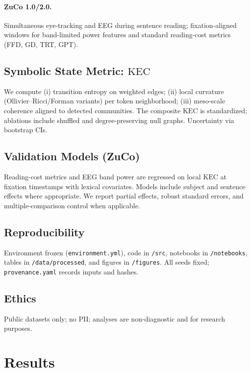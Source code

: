 \documentclass[11pt]{article}
\newcommand{\code}[1]{\texttt{#1}}
\newcommand{\kec}{\ensuremath{\mathrm{KEC}}}
\begin{document}
\paragraph{ZuCo 1.0/2.0.} Simultaneous eye-tracking and EEG during sentence reading; fixation-aligned windows for band-limited power features and standard reading-cost metrics (FFD, GD, TRT, GPT).

\subsection{Symbolic State Metric: \kec{}}
We compute (i) transition entropy on weighted edges; (ii) local curvature (Ollivier--Ricci/Forman variants) per token neighborhood; (iii) meso-scale coherence aligned to detected communities. The composite \kec{} is standardized; ablations include shuffled and degree-preserving null graphs. Uncertainty via bootstrap CIs.

\subsection{Validation Models (ZuCo)}
Reading-cost metrics and EEG band power are regressed on local \kec{} at fixation timestamps with lexical covariates. Models include subject and sentence effects where appropriate. We report partial effects, robust standard errors, and multiple-comparison control when applicable.

\subsection{Reproducibility}
Environment frozen (\code{environment.yml}), code in \code{/src}, notebooks in \code{/notebooks}, tables in \code{/data/processed}, and figures in \code{/figures}. All seeds fixed; \code{provenance.yaml} records inputs and hashes.

\subsection{Ethics}
Public datasets only; no PII; analyses are non-diagnostic and for research purposes.

\section{Results}
\end{document}
